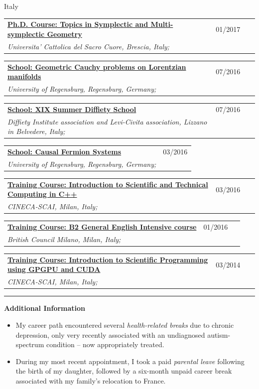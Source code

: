 \documentclass[a4paper]{article}
\newcommand{\block}[1]{\hrule \vspace{0.2cm} \textbf{\Large #1} \vspace{0.2cm}}
\newcommand{\longvoice}[8]{
    \begin{tabular}{p{0.83\linewidth} p{0.17\linewidth} }
        \textbf{\href{#3}{#2: #1}} & #4 
        \\ 
        \textit{#5, #6, #7;} & {\small\emph{#8}}
    \end{tabular}
    \vspace{.5em}
}
\begin{document}
        {Italy}
        {}
    \longvoice{Topics in Symplectic and Multi-symplectic Geometry}
        {Ph.D. Course}
        {https://web.archive.org/save/http://scuoledidottorato.unicatt.it/phdschools/science-10545.html}
        {01/2017}
        {Universita' Cattolica del Sacro Cuore}
        {Brescia}
        {Italy}
        {}
    \longvoice{Geometric Cauchy problems on Lorentzian manifolds}
        {School}
        {https://web.archive.org/web/20170623170457/http://www-app.uni-regensburg.de/Fakultaeten/MAT/GK/index.php/Summer_School_2016}
        {07/2016}
        {University of Regensburg}
        {Regensburg}
        {Germany}
        {}
    \longvoice{XIX Summer Diffiety School}
        {School}
        {https://web.archive.org/web/20170623170547/https://sites.google.com/site/levicivitainstitute//Activities/DiffietySchools/xix-summer-diffiety-school}
        {07/2016}
        {Diffiety Institute association and Levi-Civita association}
        {Lizzano in Belvedere}
        {Italy}
        {}
    \longvoice{Causal Fermion Systems}
        {School}
        {https://web.archive.org/web/20170623170718/http://www.uni-regensburg.de/mathematics/causal-fermion-systems/}
        {03/2016}
        {University of Regensburg}
        {Regensburg}
        {Germany}
        {}
    \longvoice{Introduction to Scientific and Technical Computing in C++}
        {Training Course}
        {https://web.archive.org/save/http://www.hpc.cineca.it/content/introduction-object-oriented}
        {03/2016}
        {CINECA-SCAI}
        {Milan}
        {Italy}
        {}
    \longvoice{B2 General English Intensive course}
        {Training Course}
        {https://www.britishcouncil.it/en/english/courses-adults/general}
        {01/2016}
        {British Council Milano}
        {Milan}
        {Italy}
        {}
    \longvoice{Introduction to Scientific Programming using GPGPU and CUDA}
        {Training Course}
        {https://web.archive.org/web/20170623171128/http://www.hpc.cineca.it/content/introduction-to-gpu}
        {03/2014}
        {CINECA-SCAI}
        {Milan}
        {Italy}
        {}




\par\vfill
\block{Additional Information}
\begin{itemize}[leftmargin=*, topsep=0pt, partopsep=0pt, itemsep=0.1\baselineskip, parsep=0pt]
\item[$\cdot$] My career path encountered several \emph{health-related breaks} due to chronic depression, only very recently associated with an undiagnosed autism-spectrum condition -- now appropriately treated.
\item[$\cdot$] During my most recent appointment, I took a paid \emph{parental leave} following the birth of my daughter, followed by a six-month unpaid career break associated with my family's relocation to France.
\end{itemize}
\end{document}
